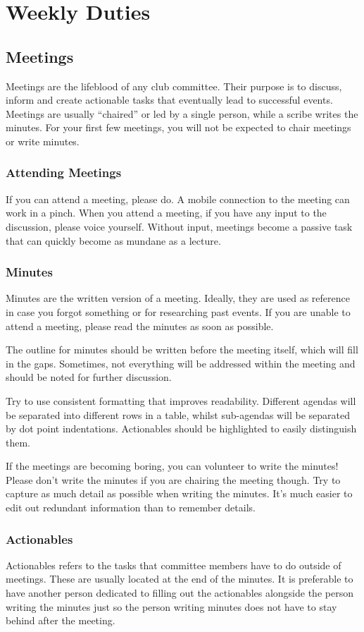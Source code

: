 \documentclass{article}
\begin{document}
\section{Weekly Duties}
\subsection{Meetings}
Meetings are the lifeblood of any club committee. Their purpose is to discuss, inform and create actionable tasks that eventually lead to successful events.
Meetings are usually “chaired” or led by a single person, while a scribe writes the minutes. For your first few meetings, you will not be expected to chair meetings or write minutes.
\subsubsection{Attending Meetings}
If you can attend a meeting, please do. A mobile connection to the meeting can work in a pinch. When you attend a meeting, if you have any input to the discussion, please voice yourself. Without input, meetings become a passive task that can quickly become as mundane as a lecture.
\subsubsection{Minutes}
Minutes are the written version of a meeting. Ideally, they are used as reference in case you forgot something or for researching past events. If you are unable to attend a meeting, please read the minutes as soon as possible.

The outline for minutes should be written before the meeting itself, which will fill in the gaps. Sometimes, not everything will be addressed within the meeting and should be noted for further discussion.

Try to use consistent formatting that improves readability. Different agendas will be separated into different rows in a table, whilst sub-agendas will be separated by dot point indentations. Actionables should be highlighted to easily distinguish them.

If the meetings are becoming boring, you can volunteer to write the minutes! Please don’t write the minutes if you are chairing the meeting though. Try to capture as much detail as possible when writing the minutes. It’s much easier to edit out redundant information than to remember details.
\subsubsection{Actionables}
Actionables refers to the tasks that committee members have to do outside of meetings. These are usually located at the end of the minutes. It is preferable to have another person dedicated to filling out the actionables alongside the person writing the minutes just so the person writing minutes does not have to stay behind after the meeting.
\end{document}
